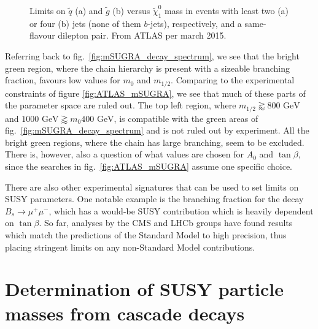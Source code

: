 \documentclass[twoside,english]{uiofysmaster}
\begin{document}
\begin{figure}[hbt]
\begin{subfigure}[b]{0.45\textwidth}
	\caption{ }
	\label{fig:ATLAS_neutralinogluino_b}
\end{subfigure}
\caption{Limits on $\tilde q$ (a) and $\tilde g$ (b) versus $\tilde \chi_1^0$ mass in events with least two (a) or four (b) jets (none of them $b$-jets), respectively, and a same-flavour dilepton pair. From ATLAS per march 2015.}
\label{fig:ATLAS_neutralinogluino}
\end{figure}

Referring back to fig.\ \ref{fig:mSUGRA_decay_spectrum}, we see that the bright green region, where the chain hierarchy is present with a sizeable branching fraction, favours low values for $m_0$ and $m_{1/2}$. Comparing to the experimental constraints of figure \ref{fig:ATLAS_mSUGRA}, we see that much of these parts of the parameter space are ruled out. The top left region, where $m_{1/2} \gtrapprox 800\,\,\mathrm{GeV}$ and $1000 \,\,\mathrm{GeV} \gtrapprox m_0 400 \,\,\mathrm{GeV}$, is compatible with the green areas of fig.\ \ref{fig:mSUGRA_decay_spectrum} and is not ruled out by experiment. All the bright green regions, where the chain has large branching, seem to be excluded. There is, however, also a question of what values are chosen for $A_0$ and $\tan\beta$, since the searches in fig.\ \ref{fig:ATLAS_mSUGRA} assume one specific choice. 

There are also other experimental signatures that can be used to set limits on SUSY parameters. One notable example is the branching fraction for the decay $B_s \to \mu^+ \mu^-$, which has a would-be SUSY contribution which is heavily dependent on $\tan\beta$. So far, analyses by the CMS and LHCb groups \cite{CMS:2014xfa} have found results which match the predictions of the Standard Model to high precision, thus placing stringent limits on any non-Standard Model contributions. 


















\chapter{Determination of SUSY particle masses from cascade decays}%
\label{ch:introducing_the_method}
\end{document}
